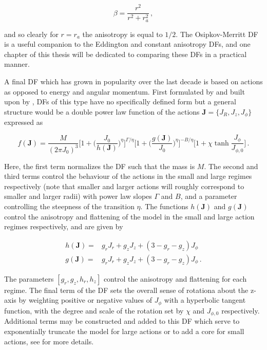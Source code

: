 \begin{equation}
    \label{ch1:eq:osipkov-merritt-anisotropy}
    \beta = \frac{r^{2}}{r^{2} + r_{a}^{2}}\,,
\end{equation}

and so clearly for $r=r_{a}$ the anisotropy is equal to $1/2$. The Osipkov-Merritt DF is a useful companion to the Eddington and constant anisotropy DFs, and one chapter of this thesis will be dedicated to comparing these DFs in a practical manner.

A final DF which has grown in popularity over the last decade is based on actions as opposed to energy and angular momentum. First formulated by \textcite{binney14d} and built upon by \textcite{posti15}, DFs of this type have no specifically defined form but a general structure would be a double power law function of the actions $\mathbf{J} = \{ J_{R}, J_{z}, J_{\phi} \}$ expressed as

\begin{equation}
    \label{ch1:eq:action-df}
    f(\mathbf{J}) = \frac{M}{(2\pi J_{0})^{3}} 
    \bigg[ 1 + \bigg( \frac{J_{0}}{h(\mathbf{J})} \bigg)^{\eta} \bigg]^{\Gamma/\eta} 
    \bigg[ 1 + \bigg( \frac{g(\mathbf{J})}{J_{0}} \bigg)^{\eta} \bigg]^{-B/\eta}
    \bigg[ 1 + \chi \tanh \frac{J_{\phi}}{J_{\phi,0}} \bigg]
    \,.
\end{equation}

\noindent Here, the first term normalizes the DF such that the mass is $M$. The second and third terms control the behaviour of the actions in the small and large regimes respectively (note that smaller and larger actions will roughly correspond to smaller and larger radii) with power law slopes $\Gamma$ and $B$, and a parameter controlling the steepness of the transition $\eta$. The functions $h(\mathbf{J})$ and $g(\mathbf{J})$ control the anisotropy and flattening of the model in the small and large action regimes respectively, and are given by 

\begin{equation}
\label{ch1:eq:action-df-flattening-anisotropy}
\begin{split}
    h(\mathbf{J}) = & g_{r} J_{r} + g_{z} J_{z} + (3-g_{r}-g_{z}) J_{\phi} \\
    g(\mathbf{J}) = & g_{r} J_{r} + g_{z} J_{z} + (3-g_{r}-g_{z}) J_{\phi}\,.
\end{split}
\end{equation}

\noindent The parameters $[g_{r}, g_{z}, h_{r}, h_{z}]$ control the anisotropy and flattening for each regime. The final term of the DF sets the overall sense of rotationa about the z-axis by weighting positive or negative values of $J_{\phi}$ with a hyperbolic tangent function, with the degree and scale of the rotation set by $\chi$ and $J_{\phi,0}$ respectively. Additional terms may be constructed and added to this DF which serve to exponentially truncate the model for large actions or to add a core for small actions, see \textcite{binney14d} for more details.

